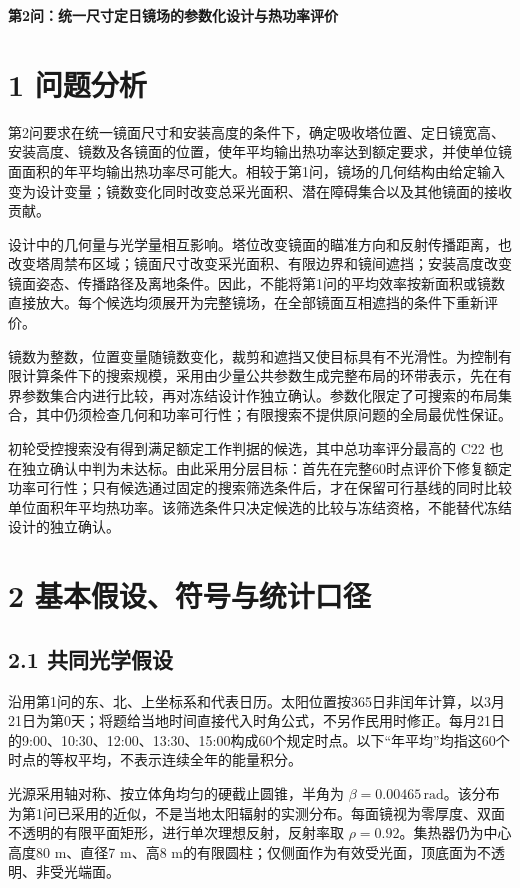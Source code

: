 \documentclass[UTF8,fontset=windows,zihao=-4]{ctexart}
\begin{document}
\begin{center}{\LARGE\bfseries 第2问：统一尺寸定日镜场的参数化设计与热功率评价}\end{center}

\section*{1 问题分析}

第2问要求在统一镜面尺寸和安装高度的条件下，确定吸收塔位置、定日镜宽高、安装高度、镜数及各镜面的位置，使年平均输出热功率达到额定要求，并使单位镜面面积的年平均输出热功率尽可能大。相较于第1问，镜场的几何结构由给定输入变为设计变量；镜数变化同时改变总采光面积、潜在障碍集合以及其他镜面的接收贡献。

设计中的几何量与光学量相互影响。塔位改变镜面的瞄准方向和反射传播距离，也改变塔周禁布区域；镜面尺寸改变采光面积、有限边界和镜间遮挡；安装高度改变镜面姿态、传播路径及离地条件。因此，不能将第1问的平均效率按新面积或镜数直接放大。每个候选均须展开为完整镜场，在全部镜面互相遮挡的条件下重新评价。

镜数为整数，位置变量随镜数变化，裁剪和遮挡又使目标具有不光滑性。为控制有限计算条件下的搜索规模，采用由少量公共参数生成完整布局的环带表示，先在有界参数集合内进行比较，再对冻结设计作独立确认。参数化限定了可搜索的布局集合，其中仍须检查几何和功率可行性；有限搜索不提供原问题的全局最优性保证。

初轮受控搜索没有得到满足额定工作判据的候选，其中总功率评分最高的 C22 也在独立确认中判为未达标。由此采用分层目标：首先在完整60时点评价下修复额定功率可行性；只有候选通过固定的搜索筛选条件后，才在保留可行基线的同时比较单位面积年平均热功率。该筛选条件只决定候选的比较与冻结资格，不能替代冻结设计的独立确认。

\section*{2 基本假设、符号与统计口径}

\subsection*{2.1 共同光学假设}

沿用第1问的东、北、上坐标系和代表日历。太阳位置按365日非闰年计算，以3月21日为第0天；将题给当地时间直接代入时角公式，不另作民用时修正。每月21日的9:00、10:30、12:00、13:30、15:00构成60个规定时点。以下“年平均”均指这60个时点的等权平均，不表示连续全年的能量积分。

光源采用轴对称、按立体角均匀的硬截止圆锥，半角为 \(\beta=0.00465\,\mathrm{rad}\)。该分布为第1问已采用的近似，不是当地太阳辐射的实测分布。每面镜视为零厚度、双面不透明的有限平面矩形，进行单次理想反射，反射率取 \(\rho=0.92\)。集热器仍为中心高度80 m、直径7 m、高8 m的有限圆柱；仅侧面作为有效受光面，顶底面为不透明、非受光端面。
\end{document}
